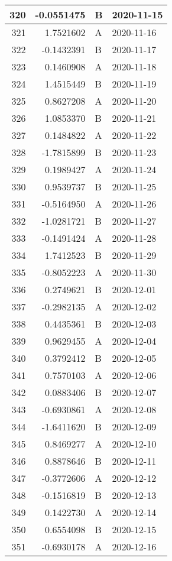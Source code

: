 \begin{tabular}{r|r|l|l}
\hline
320 & -0.0551475 & B & 2020-11-15\\
\hline
321 & 1.7521602 & A & 2020-11-16\\
\hline
322 & -0.1432391 & B & 2020-11-17\\
\hline
323 & 0.1460908 & A & 2020-11-18\\
\hline
324 & 1.4515449 & B & 2020-11-19\\
\hline
325 & 0.8627208 & A & 2020-11-20\\
\hline
326 & 1.0853370 & B & 2020-11-21\\
\hline
327 & 0.1484822 & A & 2020-11-22\\
\hline
328 & -1.7815899 & B & 2020-11-23\\
\hline
329 & 0.1989427 & A & 2020-11-24\\
\hline
330 & 0.9539737 & B & 2020-11-25\\
\hline
331 & -0.5164950 & A & 2020-11-26\\
\hline
332 & -1.0281721 & B & 2020-11-27\\
\hline
333 & -0.1491424 & A & 2020-11-28\\
\hline
334 & 1.7412523 & B & 2020-11-29\\
\hline
335 & -0.8052223 & A & 2020-11-30\\
\hline
336 & 0.2749621 & B & 2020-12-01\\
\hline
337 & -0.2982135 & A & 2020-12-02\\
\hline
338 & 0.4435361 & B & 2020-12-03\\
\hline
339 & 0.9629455 & A & 2020-12-04\\
\hline
340 & 0.3792412 & B & 2020-12-05\\
\hline
341 & 0.7570103 & A & 2020-12-06\\
\hline
342 & 0.0883406 & B & 2020-12-07\\
\hline
343 & -0.6930861 & A & 2020-12-08\\
\hline
344 & -1.6411620 & B & 2020-12-09\\
\hline
345 & 0.8469277 & A & 2020-12-10\\
\hline
346 & 0.8878646 & B & 2020-12-11\\
\hline
347 & -0.3772606 & A & 2020-12-12\\
\hline
348 & -0.1516819 & B & 2020-12-13\\
\hline
349 & 0.1422730 & A & 2020-12-14\\
\hline
350 & 0.6554098 & B & 2020-12-15\\
\hline
351 & -0.6930178 & A & 2020-12-16\\

\end{tabular}
